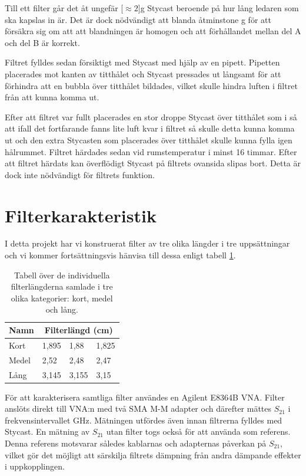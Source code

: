 \documentclass[main.tex]{subfiles}
\begin{document}
Till ett filter går det åt ungefär \unit[$\approx 2$]{g} Stycast beroende på hur lång ledaren som ska kapslas in är. Det är dock nödvändigt att blanda åtminstone \unit[10]{g} för att försäkra sig om att att blandningen är homogen och att förhållandet mellan del A och del B är korrekt. 

Filtret fylldes sedan försiktigt med Stycast med hjälp av en pipett. Pipetten placerades mot kanten av titthålet och Stycast pressades ut långsamt för att förhindra att en bubbla över titthålet bildades, vilket skulle hindra luften i filtret från att kunna komma ut. 

Efter att filtret var fullt placerades en stor droppe Stycast över titthålet som i  så att ifall det fortfarande fanns lite luft kvar i filtret så skulle detta kunna komma ut och den extra Stycasten som placerades över titthålet skulle kunna fylla igen hålrummet. Filtret härdades sedan vid rumstemperatur i minst 16 timmar. Efter att filtret härdats kan överflödigt Stycast på filtrets ovansida slipas bort. Detta är dock inte nödvändigt för filtrets funktion.


\section{Filterkarakteristik}
\label{sec:filter_kar}
I detta projekt har vi konstruerat filter av tre olika längder i tre uppsättningar och vi kommer fortsättningsvis hänvisa till dessa enligt tabell \ref{tab:filter_list}.

\begin{table}[h]
    \centering
    \caption{Tabell över de individuella filterlängderna samlade i tre olika kategorier: kort, medel och lång.}
    \label{tab:filter_list}
    \begin{tabular}{llll}\toprule
        Namn & \multicolumn{3}{c}{Filterlängd (\unit{cm})} \\
        \midrule
        Kort & 1,895 & 1,88 & 1,825 \\
        Medel & 2,52 & 2,48 & 2,47 \\
        Lång & 3,145 & 3,155 & 3,15\\
        \bottomrule
    \end{tabular}
\end{table}

För att karakterisera samtliga filter användes en Agilent E8364B VNA. Filter anslöts direkt till VNA:n med två SMA M-M adapter och därefter mättes $S_{21}$ i frekvensintervallet \unit[1-50]{GHz}. Mätningen utfördes även innan filtrerna fylldes med Stycast. En mätning av $S_{21}$ utan filter togs också för att använda som referens. Denna referens motsvarar således kablarnas och adapternas påverkan på $S_{21}$, vilket gör det möjligt att särskilja filtrets dämpning från andra dämpande effekter i uppkopplingen.%
\end{document}

